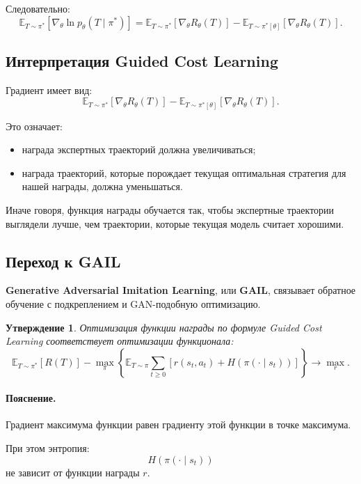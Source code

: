 \documentclass[12pt,a4paper]{article}
\newtheorem{statement}{Утверждение}
\begin{document}
Следовательно:
\[
\mathbb E_{T\sim\pi^\ast}
\left[
\nabla_\theta
\ln p_\theta(T\mid\pi^\ast)
\right]
=
\mathbb E_{T\sim\pi^\ast}
\left[
\nabla_\theta R_\theta(T)
\right]
-
\mathbb E_{T\sim\pi^\ast[\theta]}
\left[
\nabla_\theta R_\theta(T)
\right].
\]

\subsection{Интерпретация Guided Cost Learning}

Градиент имеет вид:
\[
\mathbb E_{T\sim\pi^\ast}
\left[
\nabla_\theta R_\theta(T)
\right]
-
\mathbb E_{T\sim\pi^\ast[\theta]}
\left[
\nabla_\theta R_\theta(T)
\right].
\]

Это означает:

\begin{itemize}
    \item награда экспертных траекторий должна увеличиваться;
    \item награда траекторий, которые порождает текущая оптимальная стратегия для нашей награды, должна уменьшаться.
\end{itemize}

Иначе говоря, функция награды обучается так, чтобы экспертные траектории выглядели лучше, чем траектории, которые текущая модель считает хорошими.

\subsection{Переход к GAIL}

\textbf{Generative Adversarial Imitation Learning}, или \textbf{GAIL}, связывает обратное обучение с подкреплением и GAN-подобную оптимизацию.

\begin{statement}
Оптимизация функции награды по формуле Guided Cost Learning соответствует оптимизации функционала:
\[
\mathbb E_{T\sim\pi^\ast}
\left[
R(T)
\right]
-
\max_{\pi}
\left\{
\mathbb E_{T\sim\pi}
\sum_{t\ge 0}
\left[
r(s_t,a_t)
+
H(\pi(\cdot\mid s_t))
\right]
\right\}
\to
\max_r.
\]
\end{statement}

\paragraph{Пояснение.}

Градиент максимума функции равен градиенту этой функции в точке максимума.

При этом энтропия:
\[
H(\pi(\cdot\mid s_t))
\]
не зависит от функции награды $r$.
\end{document}
